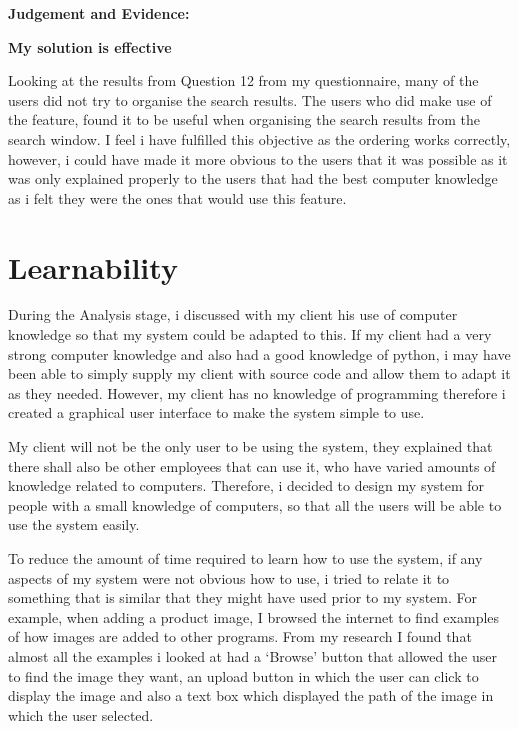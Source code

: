 \textbf{Judgement and Evidence:} \newline

\textbf{\large{My solution is effective}}

Looking at the results from Question 12 from my questionnaire, many of the users did not try to organise the search results. The users who did make use of the feature, found it to be useful when organising the search results from the search window. I feel i have fulfilled this objective as the ordering works correctly, however, i could have made it more obvious to the users that it was possible as it was only explained properly to the users that had the best computer knowledge as i felt they were the ones that would use this feature.



\section{Learnability}

During the Analysis stage, i discussed with my client his use of computer knowledge so that my system could be adapted to this. If my client had a very strong computer knowledge and also had a good knowledge of python, i may have been able to simply supply my client with source code and allow them to adapt it as they needed. However, my client has no knowledge of programming therefore i created a graphical user interface to make the system simple to use.

My client will not be the only user to be using the system, they explained that there shall also be other employees that can use it, who have varied amounts of knowledge related to computers. Therefore, i decided to design my system for people with a small knowledge of computers, so that all the users will be able to use the system easily.

To reduce the amount of time required to learn how to use the system, if any aspects of my system were not obvious how to use, i tried to relate it to something that is similar that they might have used prior to my system. For example, when adding a product image, I browsed the internet to find examples of how images are added to other programs. From my research I found that almost all the examples i looked at had a `Browse' button that allowed the user to find the image they want, an upload button in which the user can click to display the image and also a text box which displayed the path of the image in which the user selected. 

